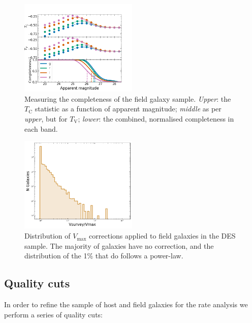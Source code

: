 \documentclass[fleqn,usenatbib]{mnras}
\begin{document}
\begin{figure}
    \centering
    \includegraphics[width=0.5\textwidth]{figs/completeness_combined.png}
    \caption{Measuring the completeness of the field galaxy sample. \textit{Upper}: the $T_{\mathrm{C}}$ statistic as a function of apparent magnitude; \textit{middle} as per \textit{upper}, but for $T_{\mathrm{V}}$; \textit{lower}: the combined, normalised completeness in each band.  
    \label{fig:completeness}}
\end{figure}

\begin{figure}
    \centering
    \includegraphics[width=0.5\textwidth]{figs/field_vmax.png}
    \caption{Distribution of $V_{\mathrm{max}}$ corrections applied to field galaxies in the DES sample. The majority of galaxies have no correction, and the distribution of the 1\% that do follows a power-law.
    \label{fig:vmax_field}}
\end{figure}

\subsection{Quality cuts \label{subsec:cuts}}

In order to refine the sample of host and field galaxies for the rate analysis we perform a series of quality cuts:
\end{document}
